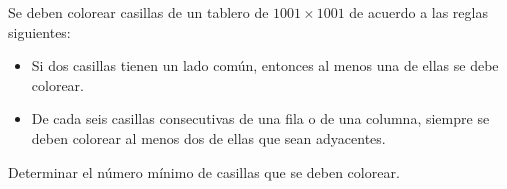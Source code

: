 Se deben colorear casillas de un tablero de $1001 \times 1001$ de acuerdo a las reglas siguientes:
 \begin{itemize} 
   \item  Si dos casillas tienen un lado común, entonces al menos una de ellas se debe colorear.
   \item  De cada seis casillas consecutivas de una fila o de una columna, siempre se deben colorear al menos dos de ellas que sean adyacentes.
 \end{itemize} 
Determinar el número mínimo de casillas que se deben colorear.
